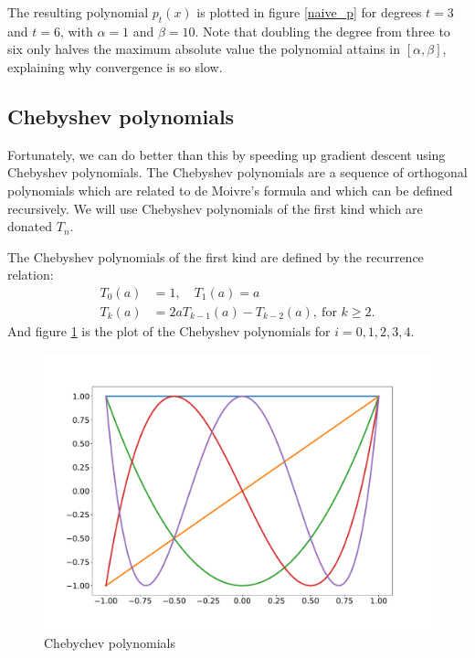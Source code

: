 The resulting polynomial $p_t(x)$ is plotted in figure \ref{naive_p} for degrees $t = 3$ and $t = 6$, with $\alpha = 1$ and $\beta = 10$. Note that doubling the degree from three to six only halves the maximum absolute value the polynomial attains in $[\alpha,\beta]$, explaining why convergence is so slow.


\subsection{Chebyshev polynomials}

Fortunately, we can do better than this by speeding up gradient descent using Chebyshev polynomials. The Chebyshev polynomials are a sequence of orthogonal polynomials which are related to de Moivre's formula and which can be defined recursively. We will use Chebyshev polynomials of the first kind which are donated $T_n$.

The Chebyshev polynomials of the first kind are defined by the recurrence relation:
\begin{align*}
T_0(a) &= 1,\quad T_1(a) = a \\
T_k(a) &= 2a T_{k-1}(a) - T_{k-2}(a),\ \text{for }k \geq 2.
\end{align*}
And figure \ref{chebychev_poly} is the plot of the Chebyshev polynomials for $i=0, 1, 2, 3, 4$. 

\begin{figure}[ht]
\includegraphics[width=15cm]{figures/lecture6-cheb_polynome.pdf}
\centering
\caption{Chebychev polynomials}
\label{chebychev_poly}
\end{figure}

